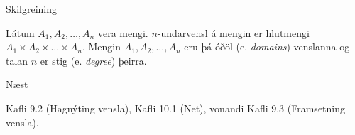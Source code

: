 \documentclass[handout]{beamer}
\begin{document}
\begin{frame}{Skilgreining}
\begin{tcolorbox}[title=n-undarvensl]
Látum $A_1, A_2, \ldots, A_n$ vera mengi. $n$-undarvensl á mengin er hlutmengi $A_1 \times A_2 \times \ldots \times A_n$. Mengin $A_1, A_2, \ldots, A_n$ eru þá óðöl (e. \emph{domains}) venslanna og talan $n$ er stig (e. \emph{degree}) þeirra.
\end{tcolorbox}

\end{frame}



\begin{frame}{Næst}

Kafli 9.2 (Hagnýting vensla), Kafli 10.1 (Net), vonandi Kafli 9.3 (Framsetning vensla).

\end{frame}
\end{document}
